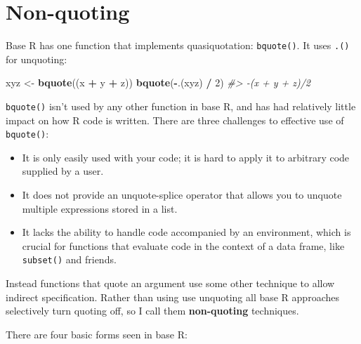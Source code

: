 \documentclass[]{book}
\makeatletter
\newenvironment{Shaded}{\begin{snugshade}}{\end{snugshade}}
\newcommand{\CommentTok}[1]{\textcolor[rgb]{0.37,0.37,0.37}{\textit{#1}}}
\newcommand{\DecValTok}[1]{\textcolor[rgb]{0.06,0.06,0.06}{#1}}
\newcommand{\KeywordTok}[1]{\textcolor[rgb]{0.27,0.27,0.27}{\textbf{#1}}}
\newcommand{\NormalTok}[1]{#1}
\newcommand{\OperatorTok}[1]{\textcolor[rgb]{0.43,0.43,0.43}{\textbf{#1}}}
\newcommand{\StringTok}[1]{\textcolor[rgb]{0.5,0.5,0.5}{#1}}
\newcommand{\indexc}[1]{\index{#1@\texttt{#1}}}
\makeatother
\begin{document}
\hypertarget{base-nonquote}{%
\section{Non-quoting}\label{base-nonquote}}

\indexc{bquote()}


Base R has one function that implements quasiquotation: \texttt{bquote()}. It uses \texttt{.()} for unquoting:

\begin{Shaded}
\begin{Highlighting}[]
\NormalTok{xyz <-}\StringTok{ }\KeywordTok{bquote}\NormalTok{((x }\OperatorTok{+}\StringTok{ }\NormalTok{y }\OperatorTok{+}\StringTok{ }\NormalTok{z))}
\KeywordTok{bquote}\NormalTok{(}\OperatorTok{-}\NormalTok{.(xyz) }\OperatorTok{/}\StringTok{ }\DecValTok{2}\NormalTok{)}
\CommentTok{#> -(x + y + z)/2}
\end{Highlighting}
\end{Shaded}

\texttt{bquote()} isn't used by any other function in base R, and has had relatively little impact on how R code is written. There are three challenges to effective use of \texttt{bquote()}:

\begin{itemize}
\item
  It is only easily used with your code; it is hard to apply it to arbitrary
  code supplied by a user.
\item
  It does not provide an unquote-splice operator that allows you to unquote
  multiple expressions stored in a list.
\item
  It lacks the ability to handle code accompanied by an environment, which
  is crucial for functions that evaluate code in the context of a data frame,
  like \texttt{subset()} and friends.
\end{itemize}

Instead functions that quote an argument use some other technique to allow indirect specification. Rather than using use unquoting all base R approaches selectively turn quoting off, so I call them \textbf{non-quoting} techniques.

There are four basic forms seen in base R:
\end{document}

